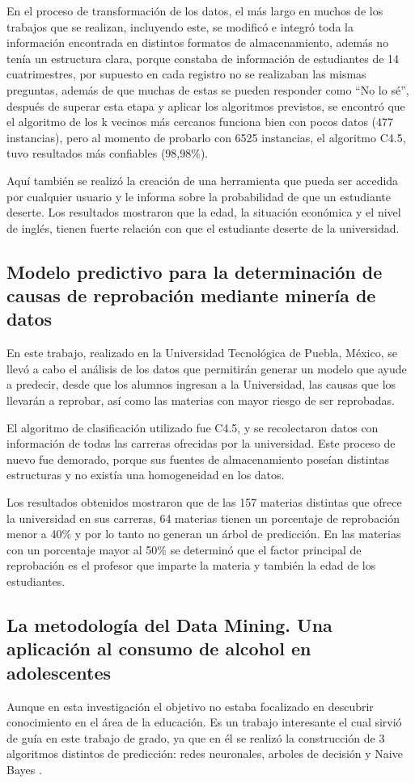 En el proceso de transformación de los datos, el más largo en muchos de los trabajos que se realizan, incluyendo este, se modificó e integró toda la información encontrada en distintos formatos de almacenamiento, además no tenía un estructura clara, porque constaba de información de estudiantes de 14 cuatrimestres, por supuesto en cada registro no se realizaban las mismas preguntas, además de que muchas de estas se pueden responder como ``No lo sé'', después de superar esta etapa y aplicar los algoritmos previstos, se encontró que el algoritmo de los k vecinos más cercanos funciona bien con pocos datos (477 instancias), pero al momento de probarlo con 6525 instancias, el algoritmo C4.5, tuvo resultados más confiables (98,98\%).

Aquí también se realizó la creación de una herramienta que pueda ser accedida por cualquier usuario y le informa sobre la probabilidad de que un estudiante deserte. Los resultados mostraron que la edad, la situación económica y el nivel de inglés, tienen fuerte relación con que el estudiante deserte de la universidad.
\subsection{Modelo predictivo para la determinación de causas de reprobación mediante minería de datos \cite{key-140}}
En este trabajo, realizado en la Universidad Tecnológica de Puebla, México, se llevó a cabo el análisis de los datos que permitirán generar un modelo que ayude a predecir, desde que los alumnos ingresan a la Universidad, las causas que los llevarán a reprobar, así como las materias con mayor riesgo de ser reprobadas.

El algoritmo de clasificación utilizado fue C4.5, y se recolectaron datos con información de todas las carreras ofrecidas por la universidad. Este proceso de nuevo fue demorado, porque sus fuentes de almacenamiento poseían distintas estructuras y no existía una homogeneidad en los datos.

Los resultados obtenidos mostraron que de las 157 materias distintas que ofrece la universidad en sus carreras, 64 materias tienen un porcentaje de reprobación menor a 40\% y por lo tanto no generan un árbol de predicción. En las materias con un porcentaje mayor al 50\% se determinó que el factor principal de reprobación es el profesor que imparte la materia y también la edad de los estudiantes.
\subsection{La metodología del Data Mining. Una aplicación al consumo de alcohol en adolescentes \cite{key-150}}
Aunque en esta investigación el objetivo no estaba focalizado en descubrir conocimiento en el área de la educación. Es un trabajo interesante el cual sirvió de guía en este trabajo de grado, ya que en él se realizó la construcción de 3 algoritmos distintos de predicción: redes neuronales, arboles de decisión y Naive Bayes \cite{key-50}.

